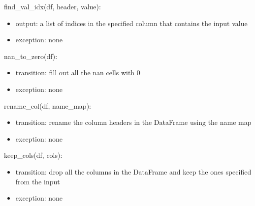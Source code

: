 \documentclass[12pt]{article}
\begin{document}
\noindent find\_val\_idx(df, header, value):
\begin{itemize}
    \item output: a list of indices in the specified column that contains the input value
    \item exception: none
\end{itemize}

\noindent nan\_to\_zero(df):
\begin{itemize}
    \item transition: fill out all the nan cells with $0$
    \item exception: none
\end{itemize}

\noindent rename\_col(df, name\_map):
\begin{itemize}
    \item transition: rename the column headers in the DataFrame using the name map
    \item exception: none
\end{itemize}

\noindent keep\_cols(df, cols):
\begin{itemize}
    \item transition: drop all the columns in the DataFrame and keep the ones specified from the input
    \item exception: none
\end{itemize}



\end{document}
